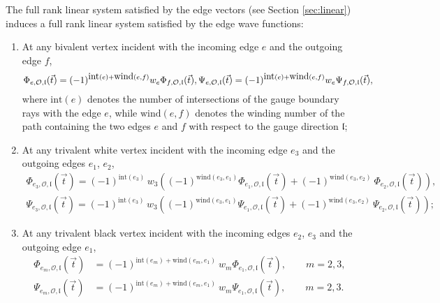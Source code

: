 \documentclass[11pt]{amsart}
\theoremstyle{plain}
\numberwithin{equation}{section}
\begin{document}
The full rank linear system satisfied by the edge vectors (see Section \ref{sec:linear}) induces a full rank linear system satisfied by the edge wave functions:
\begin{enumerate}
\item At any bivalent vertex incident with the incoming edge $e$ and the outgoing edge $f$, 
\begin{equation}\label{eq:lin_Phi1}
\Phi_{e, \mathcal O, \mathfrak l} (\vec t) =  (-1)^{\mbox{int}(e)+\mbox{wind}(e,f)} w_e \Phi_{f, \mathcal O, \mathfrak l} (\vec t), \\
\Psi_{e, \mathcal O, \mathfrak l} (\vec t) =  (-1)^{\mbox{int}(e)+\mbox{wind}(e,f)} w_e \Psi_{f, \mathcal O, \mathfrak l} (\vec t), 
\end{equation}
where $\mbox{int}(e)$ denotes the number of intersections of the gauge boundary rays with the edge $e$, while 
$\mbox{wind}(e,f)$ denotes the winding number of the path containing the two edges $e$ and $f$ with respect to the 
gauge direction  $\mathfrak l$;
\item 
At any trivalent white vertex incident with the incoming edge $e_3$ and the outgoing edges $e_1$, $e_2$,
\begin{equation}\label{eq:lin_Phi}
\begin{array}{l}
\Phi_{e_3, \mathcal O, \mathfrak l} (\vec t) =  (-1)^{\mbox{int}(e_3)} \, w_3 \left( (-1)^{\mbox{wind}(e_3, e_1)} \Phi_{e_1, \mathcal O, \mathfrak l} (\vec t) + (-1)^{\mbox{wind}(e_3, e_2)}\  \Phi_{e_2, \mathcal O, \mathfrak l} (\vec t)\right),\\
\Psi_{e_3, \mathcal O, \mathfrak l} (\vec t) = (-1)^{\mbox{int}(e_3)} \, w_3 \left( (-1)^{\mbox{wind}(e_3, e_1)} \Psi_{e_1, \mathcal O, \mathfrak l} (\vec t) + (-1)^{\mbox{wind}(e_3, e_2)}\  \Psi_{e_2, \mathcal O, \mathfrak l} (\vec t)\right);
\end{array}
\end{equation}
\item At any trivalent black vertex incident with the incoming edges  $e_2$, $e_3$ and the outgoing edge $e_1$,
\begin{equation}\label{eq:lin_Phi3}
\begin{array}{ll}
\Phi_{e_m, \mathcal O, \mathfrak l} (\vec t) &=  (-1)^{\mbox{int}(e_m)+\mbox{wind}(e_m, e_1)}\ w_m \Phi_{e_1, \mathcal O, \mathfrak l} (\vec t),\quad\quad m=2,3,\\
\Psi_{e_m, \mathcal O, \mathfrak l} (\vec t) &=  (-1)^{\mbox{int}(e_m)+\mbox{wind}(e_m, e_1)}\ w_m \Psi_{e_1, \mathcal O, \mathfrak l} (\vec t),\quad\quad m=2,3.
\end{array}
\end{equation}
\end{enumerate}
\end{document}

